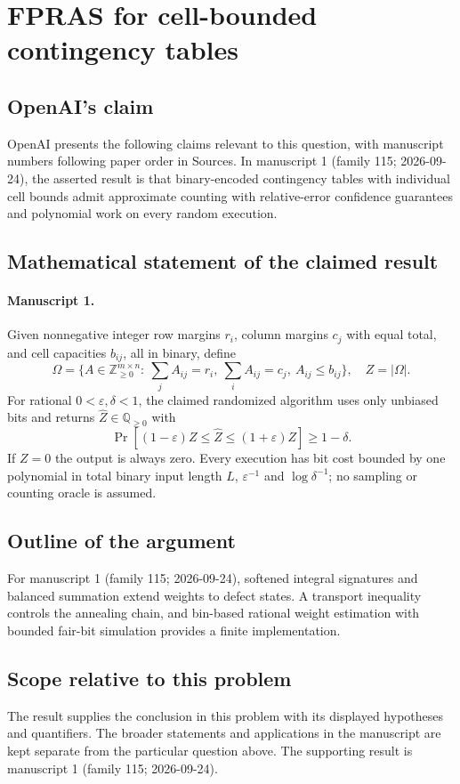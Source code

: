 \documentclass[11pt]{article}
\begin{document}
\section*{FPRAS for cell-bounded contingency tables}

\subsection{OpenAI's claim}
OpenAI presents the following claims relevant to this question, with manuscript numbers following paper order in Sources. In manuscript 1 (family 115; 2026-09-24), the asserted result is that binary-encoded contingency tables with individual cell bounds admit approximate counting with relative-error confidence guarantees and polynomial work on every random execution.

\subsection{Mathematical statement of the claimed result}
\paragraph{Manuscript 1.}
Given nonnegative integer row margins $r_i$, column margins $c_j$ with equal total, and cell capacities $b_{ij}$, all in binary, define
\[
 \Omega=\{A\in\mathbb Z_{\ge0}^{m\times n}:\ \sum_jA_{ij}=r_i,\ \sum_iA_{ij}=c_j,\ A_{ij}\le b_{ij}\},\quad Z=|\Omega|.
\]
For rational $0<\varepsilon,\delta<1$, the claimed randomized algorithm uses only unbiased bits and returns $\widehat Z\in\mathbb Q_{\ge0}$ with
\[
 \Pr[(1-\varepsilon)Z\le\widehat Z\le(1+\varepsilon)Z]\ge1-\delta.
\]
If $Z=0$ the output is always zero. Every execution has bit cost bounded by one polynomial in total binary input length $L$, $\varepsilon^{-1}$ and $\log\delta^{-1}$; no sampling or counting oracle is assumed.

\subsection{Outline of the argument}
For manuscript 1 (family 115; 2026-09-24), softened integral signatures and balanced summation extend weights to defect states. A transport inequality controls the annealing chain, and bin-based rational weight estimation with bounded fair-bit simulation provides a finite implementation.

\subsection{Scope relative to this problem}
The result supplies the conclusion in this problem with its displayed hypotheses and quantifiers. The broader statements and applications in the manuscript are kept separate from the particular question above. The supporting result is manuscript 1 (family 115; 2026-09-24).
\end{document}
